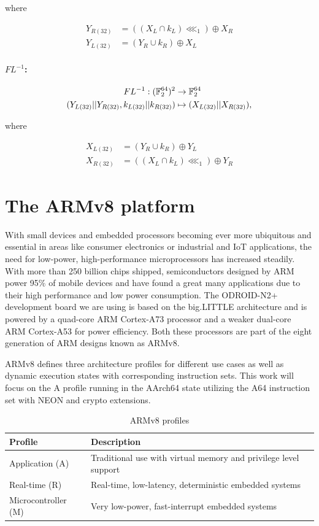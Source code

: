 where

\begin{align*}
    Y_{R(32)}&=((X_L\cap k_{L})\lll_1)\oplus X_{R} \\
    Y_{L(32)}&=(Y_R\cup k_{R})\oplus X_{L}
\end{align*}

\paragraph{$FL^{-1}$:}

\begin{align*}
    FL^{-1}:(\mathbb{F}_2^{64})^2 &\rightarrow \mathbb{F}_2^{64} \\
    (Y_{L(32)}||Y_{R(32)},k_{L(32)}||k_{R(32)})&\mapsto (X_{L(32)}||X_{R(32)}),
\end{align*}

where

\begin{align*}
    X_{L(32)}&=(Y_R\cup k_{R})\oplus Y_{L} \\
    X_{R(32)}&=((X_L\cap k_{L})\lll_1)\oplus Y_{R}
\end{align*}

\section{The ARMv8 platform}

With small devices and embedded processors becoming ever more ubiquitous and
essential in areas like consumer electronics or industrial and IoT
applications, the need for low-power, high-performance microprocessors has
increased steadily. With more than 250 billion chips shipped, semiconductors
designed by ARM power 95\% of mobile devices and have found a great many
applications due to their high performance and low power
consumption\cite{armcompany}. The ODROID-N2+\cite{odroidn2} development board
we are using is based on the big.LITTLE architecture and is powered by a
quad-core ARM Cortex-A73 processor and a weaker dual-core ARM Cortex-A53 for
power efficiency. Both these processors are part of the eight generation of ARM
designs known as ARMv8\cite{armv8:2013}.

ARMv8 defines three architecture profiles for different use cases as well as
dynamic execution states with corresponding instruction sets. This work will
focus on the A profile running in the AArch64 state utilizing the A64
instruction set with NEON and crypto extensions.

\begin{table}[h!]
    \centering
    \caption{ARMv8 profiles}
    \begin{tabularx}{\textwidth}{lX}
        \toprule
        Profile & Description \\
        \midrule
        Application (A) & Traditional use with virtual memory and privilege level support \\
        Real-time (R) & Real-time, low-latency, deterministic embedded systems \\
        Microcontroller (M) & Very low-power, fast-interrupt embedded systems \\
        \bottomrule
    \end{tabularx}
\end{table}

